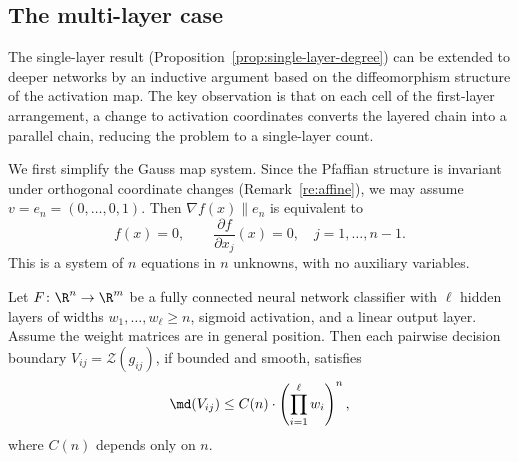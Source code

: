 \subsection{The multi-layer case}\label{subsec:multi-layer}

The single-layer result (Proposition~\ref{prop:single-layer-degree}) can be extended to deeper networks by an inductive argument based on the diffeomorphism structure of the activation map. The key observation is that on each cell of the first-layer arrangement, a change to activation coordinates converts the layered chain into a parallel chain, reducing the problem to a single-layer count.

We first simplify the Gauss map system. Since the Pfaffian structure is invariant under orthogonal coordinate changes (Remark~\ref{re:affine}), we may assume $v = e_n = (0,\ldots,0,1)$. Then $\nabla f(x) \parallel e_n$ is equivalent to
\begin{equation}\label{eq:gauss-simplified}
  f(x) = 0, \qquad \frac{\partial f}{\partial x_j}(x) = 0, \quad j = 1,\ldots, n-1.
\end{equation}
This is a system of $n$ equations in $n$ unknowns, with no auxiliary variables.

\begin{theorem}\label{thm:multi-layer-degree}
  Let $F\colon \R^n \to \R^m$ be a fully connected neural network classifier with $\ell$ hidden layers of widths $w_1,\ldots,w_\ell \geq n$, sigmoid activation, and a linear output layer. Assume the weight matrices are in general position. Then each pairwise decision boundary $V_{ij} = \mathcal{Z}(g_{ij})$, if bounded and smooth, satisfies
  \begin{equation}\label{eq:multi-layer-bound}
    \md(V_{ij}) \leq C(n)\cdot \left(\prod_{i=1}^\ell w_i\right)^n,
  \end{equation}
  where $C(n)$ depends only on $n$.
\end{theorem}

